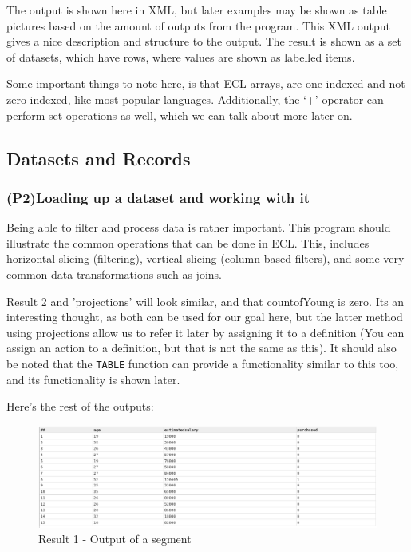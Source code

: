 \documentclass[a4paper,oneside,12pt]{book}
\begin{document}


\pagebreak
The output is shown here in XML, but later examples may be shown as table pictures based on the amount of outputs from the program.
This XML output gives a nice description and structure to the output. The result is shown as a set of datasets, which have rows, where values are shown as labelled items.

Some important things to note here, is that ECL arrays, are one-indexed and not zero indexed, like most popular languages. 
Additionally, the `+' operator can perform set operations as well, which we can talk about more later on.




\subsection{Datasets and Records}

\subsubsection[Common data operations]{(P2)Loading up a dataset and working with it}

Being able to filter and process data is rather important. This program should illustrate the common operations that can be done in ECL. This, includes horizontal slicing (filtering), vertical slicing (column-based filters), and some very common data transformations such as joins.





Result 2 and 'projections' will look similar, and that countofYoung is zero. Its an interesting thought, as both can be used for our goal here, but the latter method using projections allow us to refer it later by assigning it to a definition (You can assign an action to a definition, but that is not the same as this). It should also be noted that the \lstinline{TABLE} function can provide a functionality similar to this too, and its functionality is shown later.

Here's the rest of the outputs:

\begin{figure}[h]
    \centering
    \includegraphics[width=\linewidth]{../output/26/1.png}
    \caption{Result 1 - Output of a segment}
\end{figure}
\end{document}
